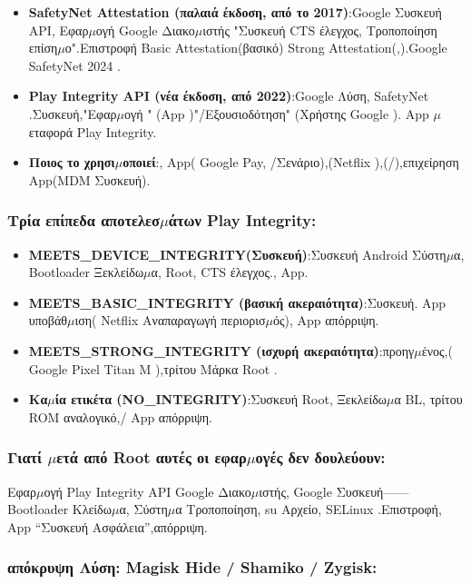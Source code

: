 \begin{itemize}
  \item \textbf{SafetyNet Attestation (παλαιά έκδοση, από το 2017)}:Google Συσκευή API, Εφαρ$\mu$ογή Google Διακο$\mu$ιστής "Συσκευή CTS έλεγχος, Τροποποίηση επίση$\mu$ο".Επιστροφή Basic Attestation(βασικό) Strong Attestation(,).Google SafetyNet 2024 .
  \item \textbf{Play Integrity API (νέα έκδοση, από 2022)}:Google Λύση, SafetyNet .Συσκευή,"Εφαρ$\mu$ογή " (App )"/Εξουσιοδότηση" (Χρήστης Google ). App $\mu$εταφορά Play Integrity.
  \item \textbf{Ποιος το χρησι$\mu$οποιεί}:, App( Google Pay, /Σενάριο),(Netflix ),(/),επιχείρηση App(MDM Συσκευή).
\end{itemize}

\subsubsection*{Τρία επίπεδα αποτελεσ$\mu$άτων Play Integrity:}

\begin{itemize}
  \item \textbf{MEETS\_DEVICE\_INTEGRITY(Συσκευή)}:Συσκευή Android Σύστη$\mu$α, Bootloader Ξεκλείδω$\mu$α, Root, CTS έλεγχος., App.
  \item \textbf{MEETS\_BASIC\_INTEGRITY (βασική ακεραιότητα)}:Συσκευή. App υποβάθ$\mu$ιση( Netflix Αναπαραγωγή περιορισ$\mu$ός), App απόρριψη.
  \item \textbf{MEETS\_STRONG\_INTEGRITY (ισχυρή ακεραιότητα)}:προηγ$\mu$ένος,( Google Pixel Titan M ),τρίτου Μάρκα Root .
  \item \textbf{Κα$\mu$ία ετικέτα (NO\_INTEGRITY)}:Συσκευή Root, Ξεκλείδω$\mu$α BL, τρίτου ROM αναλογικό,/ App απόρριψη.
\end{itemize}

\subsubsection*{Γιατί $\mu$ετά από Root αυτές οι εφαρ$\mu$ογές δεν δουλεύουν:}

Εφαρ$\mu$ογή Play Integrity API Google Διακο$\mu$ιστής, Google Συσκευή——Bootloader Κλείδω$\mu$α, Σύστη$\mu$α Τροποποίηση, su Αρχείο, SELinux .Επιστροφή, App “Συσκευή Ασφάλεια”,απόρριψη.

\subsubsection*{απόκρυψη Λύση: Magisk Hide / Shamiko / Zygisk:}

